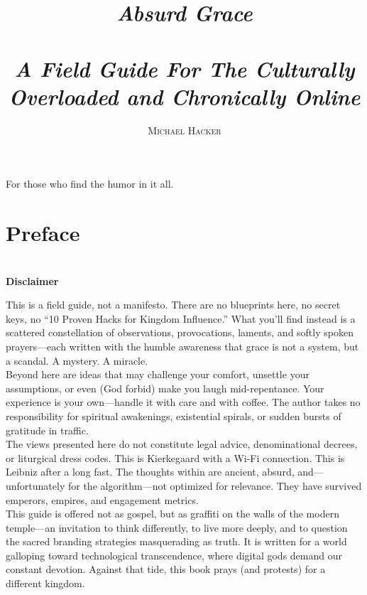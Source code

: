 \documentclass[a4paper,11pt]{book}
\title{\textit{\Huge Absurd Grace\\} \textit{\\A Field Guide For The Culturally Overloaded and Chronically Online}}
\author{\textsc{Michael Hacker}}
\newenvironment{dedication}
{
   \cleardoublepage
   \thispagestyle{empty}
   \vspace*{\stretch{1}}
   \hfill\begin{minipage}[t]{0.66\textwidth}
   \raggedright
}
{
   \end{minipage}
   \vspace*{\stretch{3}}
   \clearpage
}
\begin{document}
\maketitle

\begin{dedication}
For those who find the humor in it all.
\end{dedication}


\tableofcontents

\chapter*{Preface}

\begin{center}
\textbf{\\Disclaimer\\}
\end{center}

This is a field guide, not a manifesto. There are no blueprints here, no secret keys, no “10 Proven Hacks for Kingdom Influence.” What you’ll find instead is a scattered constellation of observations, provocations, laments, and softly spoken prayers—each written with the humble awareness that grace is not a system, but a scandal. A mystery. A miracle.
\\

Beyond here are ideas that may challenge your comfort, unsettle your assumptions, or even (God forbid) make you laugh mid-repentance. Your experience is your own—handle it with care and with coffee. The author takes no responsibility for spiritual awakenings, existential spirals, or sudden bursts of gratitude in traffic.
\\

The views presented here do not constitute legal advice, denominational decrees, or liturgical dress codes. This is Kierkegaard with a Wi-Fi connection. This is Leibniz after a long fast. The thoughts within are ancient, absurd, and—unfortunately for the algorithm—not optimized for relevance. They have survived emperors, empires, and engagement metrics.
\\

This guide is offered not as gospel, but as graffiti on the walls of the modern temple—an invitation to think differently, to live more deeply, and to question the sacred branding strategies masquerading as truth. It is written for a world galloping toward technological transcendence, where digital gods demand our constant devotion. Against that tide, this book prays (and protests) for a different kingdom.
\\
\end{document}

